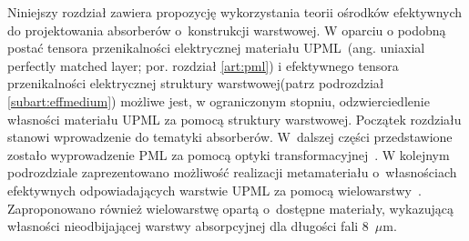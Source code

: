 Niniejszy rozdział zawiera propozycję wykorzystania teorii ośrodków efektywnych do projektowania absorberów o~konstrukcji warstwowej. W oparciu o podobną postać tensora przenikalności elektrycznej materiału UPML~(ang. uniaxial perfectly matched layer; por. rozdział \ref{art:pml}) i efektywnego tensora przenikalności elektrycznej struktury warstwowej(patrz podrozdział \ref{subart:effmedium}) możliwe jest, w ograniczonym stopniu, odzwierciedlenie własności materiału UPML za pomocą struktury warstwowej. Początek rozdziału stanowi wprowadzenie do tematyki absorberów. W~dalszej części przedstawione zostało wyprowadzenie PML za pomocą optyki transformacyjnej~\cite{pendry2012transformation}. W kolejnym podrozdziale zaprezentowano możliwość realizacji metamateriału o~własnościach efektywnych odpowiadających warstwie UPML za pomocą wielowarstwy~\cite{ania2015}. Zaproponowano również wielowarstwę opartą o~dostępne materiały, wykazującą własności nieodbijającej warstwy absorpcyjnej dla długości fali $8$~$\mu$m.


